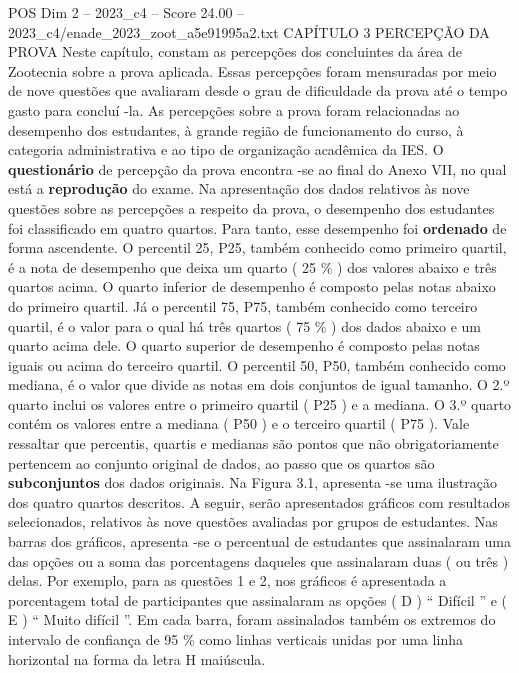 \begin{textsample}{POS Dim 2 – 2023\_c4 – Score 24.00 – 2023\_c4/enade\_2023\_zoot\_a5e91995a2.txt}  \label{ex:f2_pos_017}
CAPÍTULO 3 PERCEPÇÃO DA PROVA Neste capítulo, constam as percepções dos concluintes da área de Zootecnia sobre a prova aplicada.
Essas percepções foram mensuradas por meio de nove questões que avaliaram desde o grau de dificuldade da prova até o tempo gasto para concluí -la.
As percepções sobre a prova foram relacionadas ao desempenho dos estudantes, à grande região de funcionamento do curso, à categoria administrativa e ao tipo de organização acadêmica da IES.
O \textbf{questionário} de percepção da prova encontra -se ao final do Anexo VII, no qual está a \textbf{reprodução} do exame.
Na apresentação dos dados relativos às nove questões sobre as percepções a respeito da prova, o desempenho dos estudantes foi classificado em quatro quartos.
Para tanto, esse desempenho foi \textbf{ordenado} de forma ascendente.
O percentil 25, P25, também conhecido como primeiro quartil, é a nota de desempenho que deixa um quarto ( 25 \% ) dos valores abaixo e três quartos acima.
O quarto inferior de desempenho é composto pelas notas abaixo do primeiro quartil.
Já o percentil 75, P75, também conhecido como terceiro quartil, é o valor para o qual há três quartos ( 75 \% ) dos dados abaixo e um quarto acima dele.
O quarto superior de desempenho é composto pelas notas iguais ou acima do terceiro quartil.
O percentil 50, P50, também conhecido como mediana, é o valor que divide as notas em dois conjuntos de igual tamanho.
O 2.º quarto inclui os valores entre o primeiro quartil ( P25 ) e a mediana.
O 3.º quarto contém os valores entre a mediana ( P50 ) e o terceiro quartil ( P75 ).
Vale ressaltar que percentis, quartis e medianas são pontos que não obrigatoriamente pertencem ao conjunto original de dados, ao passo que os quartos são \textbf{subconjuntos} dos dados originais.
Na Figura 3.1, apresenta -se uma ilustração dos quatro quartos descritos.
A seguir, serão apresentados gráficos com resultados selecionados, relativos às nove questões avaliadas por grupos de estudantes.
Nas barras dos gráficos, apresenta -se o percentual de estudantes que assinalaram uma das opções ou a soma das porcentagens daqueles que assinalaram duas ( ou três ) delas.
Por exemplo, para as questões 1 e 2, nos gráficos é apresentada a porcentagem total de participantes que assinalaram as opções ( D ) “ Difícil ” e ( E ) “ Muito difícil ”.
Em cada barra, foram assinalados também os extremos do intervalo de confiança de 95 \% como linhas verticais unidas por uma linha horizontal na forma da letra H maiúscula.

\end{textsample}
